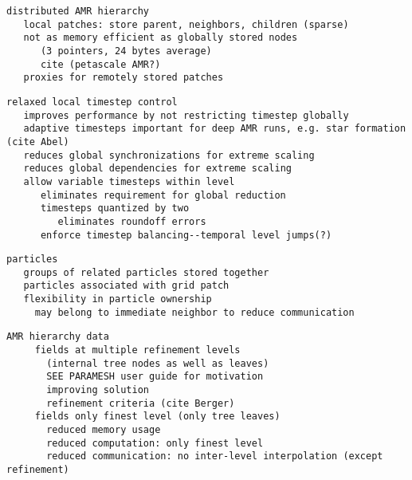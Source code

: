 \documentclass{article}
\begin{document}
\begin{verbatim}
distributed AMR hierarchy
   local patches: store parent, neighbors, children (sparse)
   not as memory efficient as globally stored nodes 
      (3 pointers, 24 bytes average)
      cite (petascale AMR?)
   proxies for remotely stored patches
\end{verbatim}

\begin{verbatim}
relaxed local timestep control
   improves performance by not restricting timestep globally
   adaptive timesteps important for deep AMR runs, e.g. star formation (cite Abel)
   reduces global synchronizations for extreme scaling
   reduces global dependencies for extreme scaling
   allow variable timesteps within level
      eliminates requirement for global reduction
      timesteps quantized by two
         eliminates roundoff errors
      enforce timestep balancing--temporal level jumps(?)
\end{verbatim}

\begin{verbatim}
particles
   groups of related particles stored together
   particles associated with grid patch
   flexibility in particle ownership
     may belong to immediate neighbor to reduce communication
\end{verbatim}

\begin{verbatim}
AMR hierarchy data
     fields at multiple refinement levels 
       (internal tree nodes as well as leaves)
       SEE PARAMESH user guide for motivation
       improving solution
       refinement criteria (cite Berger)
     fields only finest level (only tree leaves)
       reduced memory usage
       reduced computation: only finest level
       reduced communication: no inter-level interpolation (except refinement)
\end{verbatim}
\end{document}
